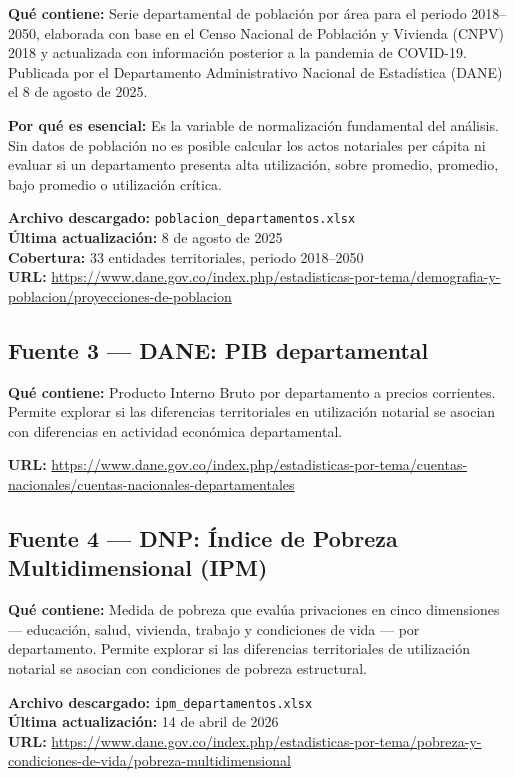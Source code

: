 \documentclass{article}
\begin{document}
\textbf{Qué contiene:} Serie departamental de población 
por área para el periodo 2018--2050, elaborada con base 
en el Censo Nacional de Población y Vivienda (CNPV) 2018 
y actualizada con información posterior a la pandemia de 
COVID-19. Publicada por el Departamento Administrativo 
Nacional de Estadística (DANE) el 8 de agosto de 2025.

\textbf{Por qué es esencial:} Es la variable de 
normalización fundamental del análisis. Sin datos de 
población no es posible calcular los actos notariales 
per cápita ni evaluar si un departamento presenta alta 
utilización, sobre promedio, promedio, bajo promedio o 
utilización crítica.

\textbf{Archivo descargado:} 
\texttt{poblacion\_departamentos.xlsx}\\
\textbf{Última actualización:} 8 de agosto de 2025\\
\textbf{Cobertura:} 33 entidades territoriales, 
periodo 2018--2050\\
\textbf{URL:} \url{https://www.dane.gov.co/index.php/estadisticas-por-tema/demografia-y-poblacion/proyecciones-de-poblacion}

\subsection{Fuente 3 — DANE: PIB departamental}

\textbf{Qué contiene:} Producto Interno Bruto por 
departamento a precios corrientes. Permite explorar 
si las diferencias territoriales en utilización notarial se asocian con 
diferencias en actividad económica departamental.

\textbf{URL:} \url{https://www.dane.gov.co/index.php/estadisticas-por-tema/cuentas-nacionales/cuentas-nacionales-departamentales}

\subsection{Fuente 4 — DNP: Índice de Pobreza 
Multidimensional (IPM)}

\textbf{Qué contiene:} Medida de pobreza que evalúa 
privaciones en cinco dimensiones — educación, salud, 
vivienda, trabajo y condiciones de vida — por 
departamento. Permite explorar si las diferencias territoriales de 
utilización notarial se asocian con condiciones de 
pobreza estructural.

\textbf{Archivo descargado:} 
\texttt{ipm\_departamentos.xlsx}\\
\textbf{Última actualización:} 14 de abril de 2026\\
\textbf{URL:} \url{https://www.dane.gov.co/index.php/estadisticas-por-tema/pobreza-y-condiciones-de-vida/pobreza-multidimensional}
\end{document}
